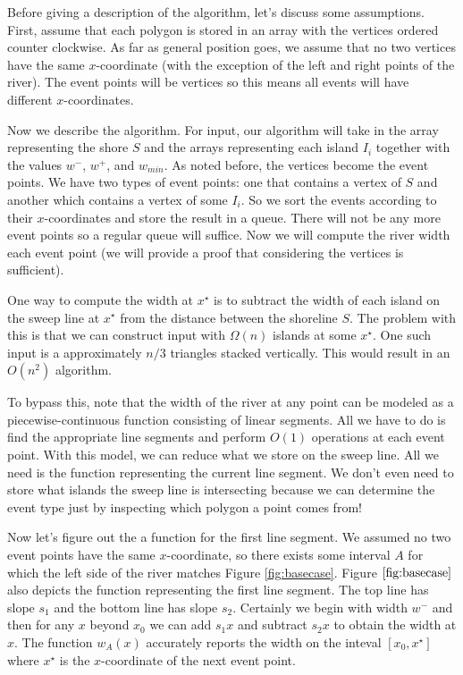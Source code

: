 \documentclass[11pt]{article}
\begin{document}
Before giving a description of the algorithm, let's discuss some assumptions.
First, assume that each polygon is stored in an array with the vertices ordered counter clockwise.
As far as general position goes, we assume that no two vertices have the same $x$-coordinate (with the exception of the left and right points of the river).
The event points will be vertices so this means all events will have different $x$-coordinates.

Now we describe the algorithm.
For input, our algorithm will take in the array representing the shore $S$ and the arrays representing each island $I_i$ together with the values $w^-$, $w^+$, and $w_{min}$.
As noted before, the vertices become the event points.
We have two types of event points: one that contains a vertex of $S$ and another which contains a vertex of some $I_i$.
So we sort the events according to their $x$-coordinates and store the result in a queue.
There will not be any more event points so a regular queue will suffice.
Now we will compute the river width each event point (we will provide a proof that considering the vertices is sufficient).

One way to compute the width at $x^\star$ is to subtract the width of each island on the sweep line at $x^\star$ from the distance between the shoreline $S$.
The problem with this is that we can construct input with $\Omega (n)$ islands at some $x^\star$.
One such input is a approximately $n/3$ triangles stacked vertically.
This would result in an $O(n^2)$ algorithm.

To bypass this, note that the width of the river at any point can be modeled as a piecewise-continuous function consisting of linear segments.
All we have to do is find the appropriate line segments and perform $O(1)$ operations at each event point.
With this model, we can reduce what we store on the sweep line.
All we need is the function representing the current line segment.
We don't even need to store what islands the sweep line is intersecting because we can determine the event type just by inspecting which polygon a point comes from!

Now let's figure out the a function for the first line segment.
We assumed no two event points have the same $x$-coordinate, so there exists some interval $A$ for which the left side of the river matches Figure \ref{fig:basecase}.
Figure $\ref{fig:basecase}$ also depicts the function representing the first line segment.
The top line has slope $s_1$ and the bottom line has slope $s_2$.
Certainly we begin with width $w^-$ and then for any $x$ beyond $x_0$ we can add $s_1 x$ and subtract $s_2 x$ to obtain the width at $x$.
The function $w_A (x)$ accurately reports the width on the inteval $[x_0, x^\star]$ where $x^\star$ is the $x$-coordinate of the next event point.
\end{document}
